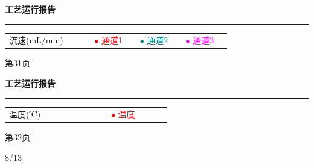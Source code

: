 \documentclass[UTF8,10pt,a4paper,fontset=fandol]{ctexart}
\newcommand{\handwritten}[1]{#1}
\begin{document}
\noindent
\begin{minipage}[t]{0.47\linewidth}
\centering
\textbf{工艺运行报告}

\vspace{2pt}
\hrule
\vspace{6pt}

\scriptsize
\begin{tabular}{p{0.28\linewidth}p{0.15\linewidth}p{0.15\linewidth}p{0.15\linewidth}}
流速(mL/min) & \textcolor{red}{\(\bullet\) 通道1} &
\textcolor{teal}{\(\bullet\) 通道2} &
\textcolor{magenta}{\(\bullet\) 通道3}
\end{tabular}

\vspace{3pt}
\begin{center}
\end{center}

\vspace{2pt}
第31页
\end{minipage}
\hfill
\begin{minipage}[t]{0.47\linewidth}
\centering
\textbf{工艺运行报告}

\vspace{2pt}
\hrule
\vspace{6pt}

\scriptsize
\begin{tabular}{p{0.34\linewidth}p{0.20\linewidth}}
温度(℃) & \textcolor{red}{\(\bullet\) 温度}
\end{tabular}

\vspace{3pt}
\begin{center}
\end{center}

\vspace{2pt}
第32页

\raggedleft
\handwritten{8/13}
\end{minipage}
\end{document}
